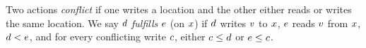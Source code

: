 \begin{definition}
   \label{def:rf}
 Two actions \emph{conflict} if one writes a location and the other
either reads or writes the same location.
We say $d$ \emph{fulfills $e$} (on $x$) if 
{} $d$ \externally writes $v$ to $x$, 
{} $e$ \externally reads $v$ from $x$,
{} $d < e$, and
{} for every conflicting write $c$, either $c
\leq d$ or $e \leq c$. %
\end{definition}

